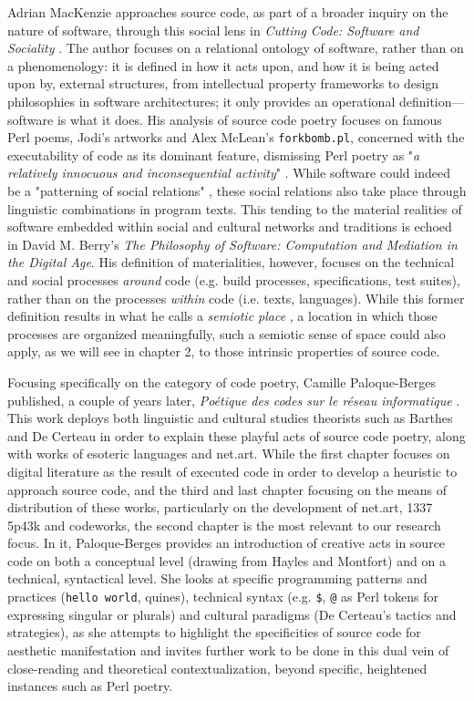 Adrian MacKenzie approaches source code, as part of a broader inquiry on the nature of software, through this social lens in \emph{Cutting Code: Software and Sociality} \citep{mackenzie_cutting_2006}. The author focuses on a relational ontology of software, rather than on a phenomenology: it is defined in how it acts upon, and how it is being acted upon by, external structures, from intellectual property frameworks to design philosophies in software architectures; it only provides an operational definition—software is what it does. His analysis of source code poetry focuses on famous Perl poems, Jodi's artworks and Alex McLean's \lstinline{forkbomb.pl}, concerned with the executability of code as its dominant feature, dismissing Perl poetry as "\emph{a relatively innocuous and inconsequential activity}" \citep{mackenzie_cutting_2006}. While software could indeed be a "patterning of social relations" \citep{mackenzie_cutting_2006}, these social relations also take place through linguistic combinations in program texts. This tending to the material realities of software embedded within social and cultural networks and traditions is echoed in David M. Berry's \emph{The Philosophy of Software: Computation and Mediation in the Digital Age}. His definition of materialities, however, focuses on the technical and social processes \emph{around} code (e.g. build processes, specifications, test suites), rather than on the processes \emph{within} code (i.e. texts, languages). While this former definition results in what he calls a \emph{semiotic place} \citep{berry_philosophy_2011}, a location in which those processes are organized meaningfully, such a semiotic sense of space could also apply, as we will see in chapter 2, to those intrinsic properties of source code.

Focusing specifically on the category of code poetry, Camille Paloque-Berges published, a couple of years later, \emph{Poétique des codes sur le réseau informatique} \citep{paloque-berges_poetique_2009}. This work deploys both linguistic and cultural studies theorists such as Barthes and De Certeau in order to explain these playful acts of source code poetry, along with works of esoteric languages and net.art. While the first chapter focuses on digital literature as the result of executed code in order to develop a heuristic to approach source code, and the third and last chapter focusing on the means of distribution of these works, particularly on the development of net.art, 1337 5p43k and codeworks, the second chapter is the most relevant to our research focus. In it, Paloque-Berges provides an introduction of creative acts in source code on both a conceptual level (drawing from Hayles and Montfort) and on a technical, syntactical level. She looks at specific programming patterns and practices (\lstinline{hello world}, quines), technical syntax (e.g. \lstinline{$}, \lstinline{@} as Perl tokens for expressing singular or plurals) and cultural paradigms (De Certeau's tactics and strategies), as she attempts to highlight the specificities of source code for aesthetic manifestation and invites further work to be done in this dual vein of close-reading and theoretical contextualization, beyond specific, heightened instances such as Perl poetry.


